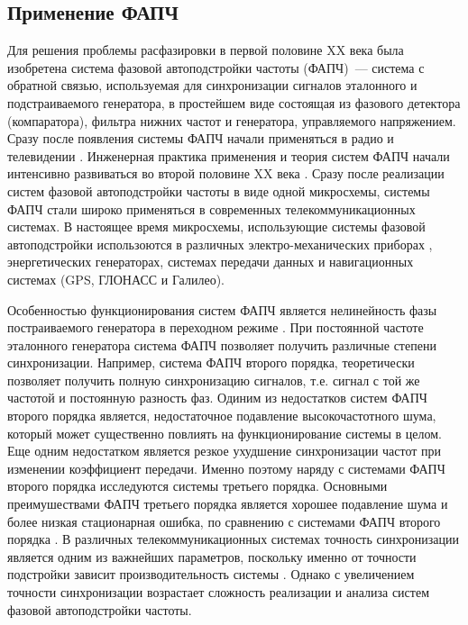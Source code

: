 \documentclass[a4paper,article,14pt]{extarticle}
\begin{document}
 \subsection{Применение ФАПЧ}

Для решения проблемы расфазировки в первой половине XX века была изобретена система фазовой автоподстройки частоты \cite{appleton} (ФАПЧ)~--- система с обратной связью, используемая для синхронизации сигналов эталонного и подстраиваемого генератора, в простейшем виде состоящая из фазового детектора (компаратора), фильтра нижних частот и генератора, управляемого напряжением. Сразу после появления системы ФАПЧ начали применяться в радио и телевидении \cite{blagov}. Инженерная практика применения и теория систем ФАПЧ начали интенсивно развиваться во второй половине XX века \cite{seledji}. Сразу после реализации систем фазовой автоподстройки частоты в виде одной микросхемы, системы ФАПЧ стали широко применяться в современных телекоммуникационных системах. В настоящее время микросхемы, использующие системы фазовой автоподстройки использоются в различных электро-механических приборах \cite{best}, энергетических генераторах, системах передачи данных \cite{ashari} и навигационных системах \cite{rao} (GPS, ГЛОНАСС и Галилео).

Особенностью функционирования систем ФАПЧ является нелинейность фазы постраиваемого генератора в переходном режиме \cite{kuznetsov_nonlinear}. При постоянной частоте эталонного генератора система ФАПЧ позволяет получить различные степени синхронизации. Например, система ФАПЧ второго порядка, теоретически позволяет получить полную синхронизацию сигналов, т.е. сигнал с той же частотой и постоянную разность фаз. Одиним из недостатков систем ФАПЧ второго порядка является, недостаточное подавление высокочастотного шума, который может существенно повлиять на функционирование системы в целом. Еще одним недостатком является резкое ухудшение синхронизации частот при изменении коэффициент передачи. Именно поэтому наряду с системами ФАПЧ второго порядка исследуются системы третьего порядка. Основными преимушествами ФАПЧ третьего порядка является хорошее подавление шума и более низкая стационарная ошибка, по сравнению с системами ФАПЧ второго порядка \cite{thirdOrderPLL}. В различных телекоммуникационных системах точность синхронизации является одним из важнейших параметров, поскольку именно от точности подстройки зависит производительность системы \cite{UsageOfThirdOrder1}. Однако с увеличением точности синхронизации возрастает сложность реализации и анализа систем фазовой автоподстройки частоты. 
\end{document}
